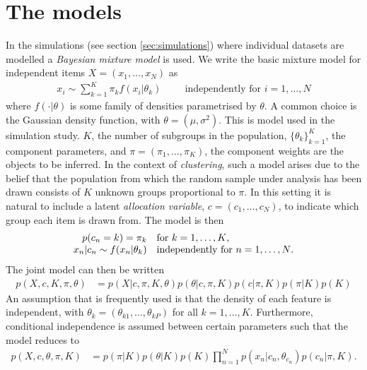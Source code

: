 \documentclass[]{article}
\begin{document}
\section{The models} \label{sec:models}
In the simulations (see section \ref{sec:simulations}) where individual datasets are modelled a \emph{Bayesian mixture model} is used. We write the basic mixture model for independent items $X=(x_1, \ldots, x_N)$ as 
\begin{align}
	x_i \sim \sum_{k=1}^K\pi_k f(x_i | \theta_k) \hspace{1cm} \textrm{independently for $i = 1,\ldots,N$}
\end{align}
where $f(\cdot| \theta)$ is some family of densities parametrised by $\theta$. A common choice is the Gaussian density function, with $\theta=(\mu, \sigma^2)$. This is model used in the simulation study. $K$, the number of subgroups in the population, $\{\theta_k\}_{k=1}^K$, the component parameters, and $\pi=(\pi_1, \ldots, \pi_K)$, the component weights are the objects to be inferred. In the context of \emph{clustering}, such a model arises due to the belief that the population from which the random sample under analysis has been drawn consists of $K$ unknown groups proportional to $\pi$. In this setting it is natural to include a latent \emph{allocation variable}, $c=(c_1, \ldots, c_N)$, to indicate which group each item is drawn from. The model is then
\begin{equation}
	\label{eqn:mixModel}
	\begin{array}{r@{}l l}
		p(c_n = k) = \pi_k&  &\textrm{for $k = 1,\ldots,K$,} \\
		x_n | c_n \sim f(x_n | \theta_k)& &\textrm{independently for $n = 1,\ldots,N$.} 
	\end{array}
\end{equation}
The joint model can then be written
\begin{align}
	p(X, c, K, \pi, \theta) &= p(X | c, \pi, K, \theta) p(\theta | c, \pi, K) p(c | \pi, K) p(\pi | K) p(K) \nonumber
\end{align}
An assumption that is frequently used is that the density of each feature is independent, with $\theta_k=(\theta_{k1},\ldots, \theta_{kP})$ for all $k=1,\ldots,K$. Furthermore, conditional independence is assumed between certain parameters such that the model reduces to
\begin{align}
	p(X, c, \theta, \pi, K) &=  p(\pi | K) p(\theta | K) p(K) \prod_{n=1}^N p(x_n | c_n, \theta_{c_n}) p (c_n | \pi, K).  \label{eqn:jointMixModel}
\end{align}
\end{document}
